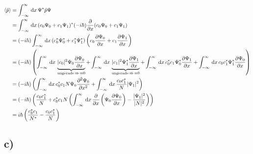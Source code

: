 \begin{align}
    \langle \hat p \rangle &= \int_{-\infty}^{\infty} \,\mathrm{d}x\, \Psi ^* \hat p \Psi \\
    &= \int_{-\infty}^{\infty} \,\mathrm{d}x\, (c_0 \Psi _0 + c_1 \Psi _1)^*(-i \hbar)\frac{\partial}{\partial x} (c_0 \Psi _0+c_1 \Psi _1)\\
    &= (-i \hbar) \int_{-\infty}^{\infty} \,\mathrm{d}x\, (c_0^* \Psi _0^*+c_1^* \Psi _1^*)\left(c_0 \frac{\partial \Psi _0}{\partial x}+ c_1 \frac{\partial \Psi _1}{\partial x} \right)\\
    &= (-i\hbar) \left(\int_{-\infty}^{\infty} \,\mathrm{d}x\, \underbrace{\lvert c_0\rvert^2 \Psi _0 \frac{\partial \Psi _0}{\partial x}}_{\text{ungerade\,} \Rightarrow\, =0} +\int_{-\infty}^{\infty} \,\mathrm{d}x\, \underbrace{\lvert c_1\rvert^2 \Psi _1^* 
    \frac{\partial \Psi _1  }{\partial x}}_{\text{ungerade}\, \Rightarrow\, =0} + \int_{-\infty}^{\infty} \,\mathrm{d}x\, c_0^* c_1 \Psi _0^* \frac{\partial \Psi _1}{\partial x}+\int_{-\infty}^{\infty} \,\mathrm{d}x\, c_0 c_1^* \Psi _1^* \frac{\partial \Psi _0}{\partial x} \right)\\
    &=(-i \hbar) \left(\int_{-\infty}^{\infty} \,\mathrm{d}x\, c_0^* c_1 N \Psi _0 \frac{\partial ^2 \Psi _0}{\partial x^2} +\int_{-\infty}^{\infty} \,\mathrm{d}x\,\frac{c_0 c_1^*}{N} \lvert\Psi _1\rvert^2 \right)\\
    &=(-i \hbar) \left(\frac{c_0 c_1^*}{N}+c_0^* c_1 N\left(\int_{-\infty}^{\infty} \,\mathrm{d}x\, \frac{\partial}{\partial x} \left(\Psi _0 \frac{\partial \Psi _0}{\partial x} \right)-\frac{\lvert\Psi _1\rvert^2}{\lvert N\rvert^2} \right)\right)\\
    &= i \hbar \left(\frac{c_0^*c_1}{N^*} -\frac{c_0c_1^*}{N} \right)
\end{align}

\subsection{c)}
 
